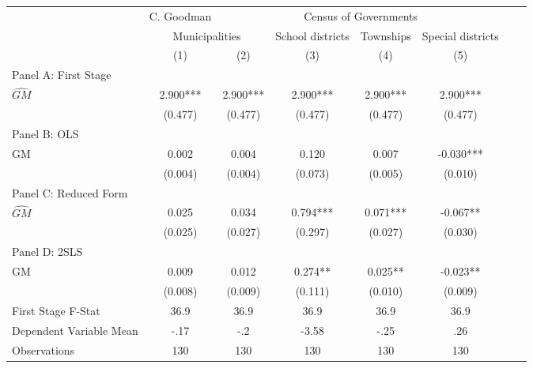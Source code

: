  \begin{tabular}{l*{7}{c}} \toprule
&\multicolumn{1}{c}{C. Goodman}&\multicolumn{4}{c}{Census of Governments}\\\cmidrule(lr){2-2}\cmidrule(lr){3-6}
&\multicolumn{2}{c}{Municipalities}&\multicolumn{1}{c}{School districts}&\multicolumn{1}{c}{Townships}&\multicolumn{1}{c}{Special districts}\\\cmidrule(lr){2-3}\cmidrule(lr){4-6}
&\multicolumn{1}{c}{(1)}&\multicolumn{1}{c}{(2)}&\multicolumn{1}{c}{(3)}&\multicolumn{1}{c}{(4)}&\multicolumn{1}{c}{(5)}\\
\cmidrule(lr){1-6}
\multicolumn{5}{l}{Panel A: First Stage}\\
\cmidrule(lr){1-6}
$\widehat{GM}$  &    2.900***&    2.900***&    2.900***&    2.900***&    2.900***\\
                &  (0.477)   &  (0.477)   &  (0.477)   &  (0.477)   &  (0.477)   \\
\cmidrule(lr){1-6}
\multicolumn{5}{l}{Panel B: OLS}\\
\cmidrule(lr){1-6}
GM              &    0.002   &    0.004   &    0.120   &    0.007   &   -0.030***\\
                &  (0.004)   &  (0.004)   &  (0.073)   &  (0.005)   &  (0.010)   \\
\cmidrule(lr){1-6}
\multicolumn{5}{l}{Panel C: Reduced Form}\\
\cmidrule(lr){1-6}
$\widehat{GM}$  &    0.025   &    0.034   &    0.794***&    0.071***&   -0.067** \\
                &  (0.025)   &  (0.027)   &  (0.297)   &  (0.027)   &  (0.030)   \\
\cmidrule(lr){1-6}
\multicolumn{5}{l}{Panel D: 2SLS}\\
\cmidrule(lr){1-6}
GM              &    0.009   &    0.012   &    0.274** &    0.025** &   -0.023** \\
                &  (0.008)   &  (0.009)   &  (0.111)   &  (0.010)   &  (0.009)   \\
\midrule
First Stage F-Stat&     36.9   &     36.9   &     36.9   &     36.9   &     36.9   \\
Dependent Variable Mean&     -.17   &      -.2   &    -3.58   &     -.25   &      .26   \\
Observations    &      130   &      130   &      130   &      130   &      130   \\
 \bottomrule \end{tabular}
